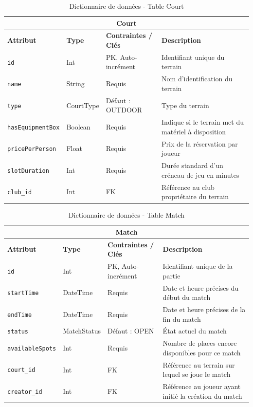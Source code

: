 \documentclass[12pt]{article}
\begin{document}
\vspace{0.5cm}
\begin{table}[H]
    \centering
    \begin{tabularx}{\textwidth}{|l|l|l|X|}
    \hline
    \multicolumn{4}{|c|}{\cellcolor[gray]{0.9} \textbf{Court}} \\ \hline
    \textbf{Attribut} & \textbf{Type} & \textbf{Contraintes / Clés} & \textbf{Description} \\ \hline
    \texttt{id} & Int & PK, Auto-incrément & Identifiant unique du terrain \\ \hline
    \texttt{name} & String & Requis & Nom d'identification du terrain \\ \hline
    \texttt{type} & CourtType & Défaut : OUTDOOR & Type du terrain \\ \hline
    \texttt{hasEquipmentBox} & Boolean & Requis & Indique si le terrain met du matériel à disposition \\ \hline
    \texttt{pricePerPerson} & Float & Requis & Prix de la réservation par joueur \\ \hline
    \texttt{slotDuration} & Int & Requis & Durée standard d'un créneau de jeu en minutes \\ \hline
    \texttt{club\_id} & Int & FK & Référence au club propriétaire du terrain \\ \hline
    \end{tabularx}
    \caption{Dictionnaire de données - Table Court}
    \label{tab:dict_court}
\end{table}

\vspace{0.5cm}
\begin{table}[H]
    \centering
    \begin{tabularx}{\textwidth}{|l|l|l|X|}
    \hline
    \multicolumn{4}{|c|}{\cellcolor[gray]{0.9} \textbf{Match}} \\ \hline
    \textbf{Attribut} & \textbf{Type} & \textbf{Contraintes / Clés} & \textbf{Description} \\ \hline
    \texttt{id} & Int & PK, Auto-incrément & Identifiant unique de la partie \\ \hline
    \texttt{startTime} & DateTime & Requis & Date et heure précises du début du match \\ \hline
    \texttt{endTime} & DateTime & Requis & Date et heure précises de la fin du match \\ \hline
    \texttt{status} & MatchStatus & Défaut : OPEN & État actuel du match \\ \hline
    \texttt{availableSpots} & Int & Requis & Nombre de places encore disponibles pour ce match \\ \hline
    \texttt{court\_id} & Int & FK  & Référence au terrain sur lequel se joue le match \\ \hline
    \texttt{creator\_id} & Int & FK & Référence au joueur ayant initié la création du match \\ \hline
    \end{tabularx}
    \caption{Dictionnaire de données - Table Match}
    \label{tab:dict_match}
\end{table}
\end{document}
